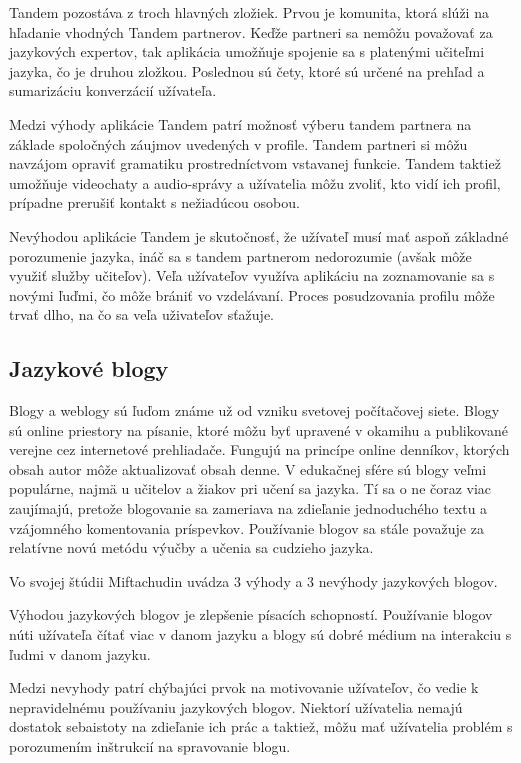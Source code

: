\documentclass[10pt,oneside,slovak,a4paper]{article}
\begin{document}
Tandem pozostáva z troch hlavných zložiek. Prvou je komunita, ktorá slúži na hľadanie vhodných Tandem partnerov. Keďže partneri sa nemôžu považovať za jazykových expertov, tak aplikácia umožňuje spojenie sa s platenými učiteľmi jazyka, čo je druhou zložkou. Poslednou sú čety, ktoré sú určené na prehľad a sumarizáciu konverzácií užívateľa.

 Medzi výhody aplikácie Tandem patrí možnosť výberu tandem partnera na základe spoločných záujmov uvedených v profile.
Tandem partneri si môžu navzájom opraviť gramatiku prostredníctvom vstavanej funkcie.
Tandem taktiež umožňuje videochaty a audio-správy a
užívatelia môžu zvoliť, kto vidí ich profil, prípadne prerušiť kontakt s nežiadúcou osobou. \cite{tandem}

Nevýhodou aplikácie Tandem je skutočnosť, že
užívateľ musí mať aspoň základné porozumenie jazyka, ináč sa s tandem partnerom nedorozumie (avšak môže využiť služby učiteľov).
Veľa užívateľov využíva aplikáciu na zoznamovanie sa s novými ľuďmi, čo môže brániť vo vzdelávaní.
Proces posudzovania profilu môže trvať dlho, na čo sa veľa uživateľov sťažuje. \cite{tandem}

\subsection{Jazykové blogy} %

Blogy a weblogy sú ľuďom známe už od vzniku svetovej počítačovej siete. Blogy sú online priestory na písanie, ktoré môžu byť upravené v okamihu a publikované verejne cez internetové prehliadače. Fungujú na princípe online denníkov, ktorých obsah autor môže aktualizovať obsah denne. V edukačnej sfére sú blogy veľmi  populárne, najmä u učitelov a žiakov pri učení sa jazyka. Tí sa o ne čoraz viac zaujímajú, pretože blogovanie sa zameriava na zdieľanie jednoduchého textu a vzájomného komentovania príspevkov. Používanie blogov sa stále považuje za relatívne novú metódu výučby a učenia sa cudzieho jazyka. \cite{blog-mif}

Vo svojej štúdii Miftachudin \cite{blog-mif} uvádza 3 výhody a 3 nevýhody jazykových blogov.

Výhodou jazykových blogov je
 zlepšenie písacích schopností.
 Používanie blogov núti užívateľa čítať viac v danom jazyku a
blogy sú dobré médium na interakciu s ľudmi v danom jazyku. \cite{blog-mif}

Medzi nevyhody patrí
 chýbajúci prvok na motivovanie užívateľov, čo vedie k nepravidelnému používaniu jazykových blogov.
Niektorí užívatelia nemajú dostatok sebaistoty na zdieľanie ich prác a taktiež,
môžu mať užívatelia problém s porozumením inštrukcií na spravovanie blogu. \cite{blog-mif}
\end{document}
